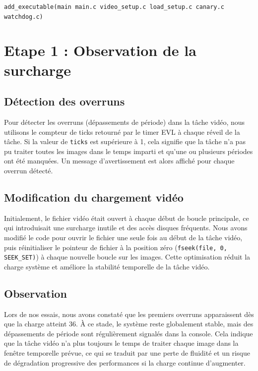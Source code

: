 \documentclass[a4paper,12pt]{article}
\begin{document}
\begin{verbatim}
add_executable(main main.c video_setup.c load_setup.c canary.c watchdog.c)
\end{verbatim}

\newpage

\section{Etape 1 : Observation de la surcharge}

\subsection{Détection des overruns}

Pour détecter les overruns (dépassements de période) dans la tâche vidéo, nous utilisons le compteur de ticks retourné par le timer EVL à chaque réveil de la tâche. Si la valeur de \texttt{ticks} est supérieure à 1, cela signifie que la tâche n'a pas pu traiter toutes les images dans le temps imparti et qu'une ou plusieurs périodes ont été manquées. Un message d'avertissement est alors affiché pour chaque overrun détecté.

\subsection{Modification du chargement vidéo}

Initialement, le fichier vidéo était ouvert à chaque début de boucle principale, ce qui introduisait une surcharge inutile et des accès disques fréquents. Nous avons modifié le code pour ouvrir le fichier une seule fois au début de la tâche vidéo, puis réinitialiser le pointeur de fichier à la position zéro (\texttt{fseek(file, 0, SEEK\_SET)}) à chaque nouvelle boucle sur les images. Cette optimisation réduit la charge système et améliore la stabilité temporelle de la tâche vidéo.

\subsection{Observation}

Lors de nos essais, nous avons constaté que les premiers overruns apparaissent dès que la charge atteint 36. À ce stade, le système reste globalement stable, mais des dépassements de période sont régulièrement signalés dans la console. Cela indique que la tâche vidéo n'a plus toujours le temps de traiter chaque image dans la fenêtre temporelle prévue, ce qui se traduit par une perte de fluidité et un risque de dégradation progressive des performances si la charge continue d'augmenter.
\end{document}
